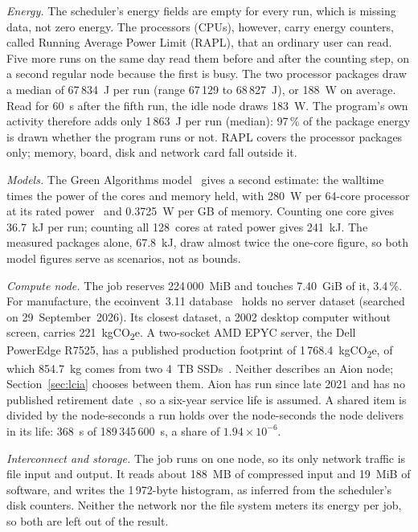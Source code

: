 \documentclass[conference,a4paper]{IEEEtran}
\begin{document}
\emph{Energy.} The scheduler's energy fields are empty for every run, which is
missing data, not zero energy. The processors (CPUs), however, carry energy
counters, called Running Average Power Limit (RAPL), that an ordinary user can
read. Five more runs on the same day read them before and after the counting
step, on a second regular node because the first is busy. The two processor
packages draw a median of 67\,834~J per run (range 67\,129 to 68\,827~J), or
188~W on average. Read for 60~s after the fifth run, the idle node draws 183~W.
The program's own activity therefore adds only 1\,863~J per run (median): 97\,\%
of the package energy is drawn whether the program runs or not. RAPL covers the
processor packages only; memory, board, disk and network card fall outside it.

\emph{Models.} The Green Algorithms model~\cite{lannelongue2021} gives a second
estimate: the walltime times the power of the cores and memory held, with
280~W per 64-core processor at its rated power~\cite{ulhpcaion} and 0.3725~W per
GB of memory. Counting one core gives 36.7~kJ per run; counting all 128~cores at
rated power gives 241~kJ. The measured packages alone, 67.8~kJ, draw almost
twice the one-core figure, so both model figures serve as scenarios, not as
bounds.

\emph{Compute node.} The job reserves 224\,000~MiB and touches 7.40~GiB of it,
3.4\,\%. For manufacture, the ecoinvent~3.11 database~\cite{ecoinvent311} holds
no server dataset (searched on 29~September~2026). Its closest dataset, a 2002
desktop computer without screen, carries 221~kgCO\textsubscript{2}e. A two-socket
AMD EPYC server, the Dell PowerEdge R7525, has a published production footprint
of 1\,768.4~kgCO\textsubscript{2}e, of which 854.7~kg comes from two 4~TB
SSDs~\cite{dellr7525}. Neither describes an Aion node; Section~\ref{sec:lcia}
chooses between them. Aion has run since late 2021 and has no published
retirement date~\cite{ulhpcaion}, so a six-year service life is assumed. A
shared item is divided by the node-seconds a run holds over the node-seconds the
node delivers in its life: 368~s of 189\,345\,600~s, a share of
$1.94\times10^{-6}$.

\emph{Interconnect and storage.} The job runs on one node, so its only network
traffic is file input and output. It reads about 188~MB of compressed input and
19~MiB of software, and writes the 1\,972-byte histogram, as inferred from the
scheduler's disk counters. Neither the network nor the file system meters its
energy per job, so both are left out of the result.
\end{document}
